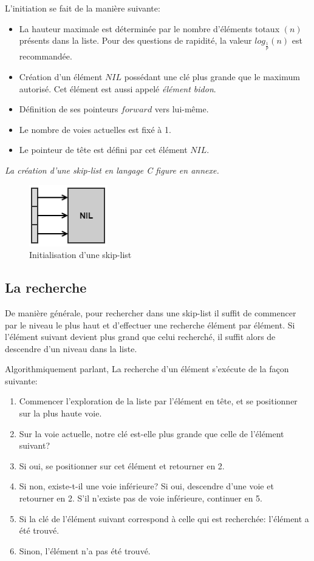 \documentclass[hidelinks,a4paper, 12pt]{article}
\begin{document}
	L'initiation se fait de la manière suivante:
	\begin{itemize}
		\item La hauteur maximale est déterminée par le nombre d'éléments totaux $(n)$ présents dans la liste. Pour des questions de rapidité, la valeur $log_\frac{1}{p}(n)$ est recommandée.
		\item Création d'un élément $NIL$ possédant une clé plus grande que le maximum autorisé. Cet élément est aussi appelé \textit{élément bidon}.
		\item Définition de ses pointeurs $forward$ vers lui-même.
		\item Le nombre de voies actuelles est fixé à 1.
		\item Le pointeur de tête est défini par cet élément $NIL$.
	\end{itemize}
	\emph{La création d'une skip-list en langage C figure en annexe.}
	
	\begin{figure}[h]
		\includegraphics[scale=0.95]{img/init}
		\caption{Initialisation d'une skip-list}
		\label{SkipInit}
	\end{figure}
	
	\newpage
	\subsection{La recherche}
	De manière générale, pour rechercher dans une skip-list il suffit de commencer par le niveau le plus haut et d'effectuer une recherche élément par élément. Si l'élément suivant devient plus grand que celui recherché, il suffit alors de descendre d'un niveau dans la liste.
	
	Algorithmiquement parlant, La recherche d'un élément s'exécute de la façon suivante:
	\begin{enumerate}
		\item Commencer l'exploration de la liste par l'élément en tête, et se positionner sur la plus haute voie.
		\item Sur la voie actuelle, notre clé est-elle plus grande que celle de l'élément suivant?
		\item Si oui, se positionner sur cet élément et retourner en 2.
		\item Si non, existe-t-il une voie inférieure?
		\subitem Si oui, descendre d'une voie et retourner en 2. 
		\subitem S'il n'existe pas de voie inférieure, continuer en 5.
		\subitem
		\item Si la clé de l'élément suivant correspond à celle qui est recherchée: l'élément a été trouvé.
		\item Sinon, l'élément n'a pas été trouvé.
	\end{enumerate}
	
\end{document}
